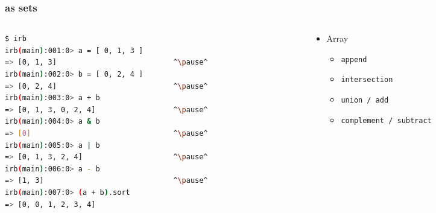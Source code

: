 \begin{frame}[fragile]\frametitle{as sets}

\begin{columns}[c] 

\begin{column}{7cm}
\begin{lstlisting}[language=bash, escapechar={^}]
$ irb
irb(main):001:0> a = [ 0, 1, 3 ]
=> [0, 1, 3]                           ^\pause^
irb(main):002:0> b = [ 0, 2, 4 ]
=> [0, 2, 4]                           ^\pause^
irb(main):003:0> a + b
=> [0, 1, 3, 0, 2, 4]                  ^\pause^
irb(main):004:0> a & b
=> [0]                                 ^\pause^
irb(main):005:0> a | b
=> [0, 1, 3, 2, 4]                     ^\pause^
irb(main):006:0> a - b
=> [1, 3]                              ^\pause^
irb(main):007:0> (a + b).sort
=> [0, 0, 1, 2, 3, 4]
\end{lstlisting}
\end{column}

\pause

\begin{column}{4cm}
\begin{itemize}

\item Array
\begin{itemize}
\item \texttt{append}
\item \texttt{intersection}
\item \texttt{union / add}
\item \texttt{complement / subtract}
\end{itemize}

\end{itemize}
\end{column}

\end{columns}

\end{frame}








